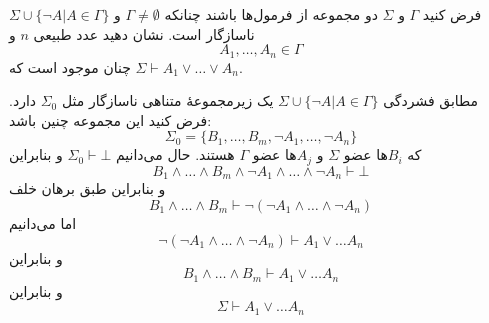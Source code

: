 فرض کنید $\Gamma$ و $\Sigma$ دو مجموعه از فرمول‌ها باشند چنانکه $\Gamma\neq\emptyset$ و
$\Sigma\cup\{\neg A|A\in\Gamma\}$
ناسازگار است. نشان دهید عدد طبیعی $n$ و
$$
A_1,\ldots,A_n\in\Gamma
$$
چنان موجود است که
$\Sigma\vdash A_1\vee\ldots\vee A_n$.
\begin{ans}
  مطابق فشردگی
  $\Sigma\cup\{\neg A|A\in\Gamma\}$
  یک زیرمجموعهٔ متناهی ناسازگار مثل
  $\Sigma_0$
  دارد. فرض کنید این مجموعه چنین باشد:
  $$
  \Sigma_0 = \{B_1,\ldots,B_m,\neg A_1,\ldots,\neg A_n\}
  $$
  که $B_i$ها عضو $\Sigma$ و $A_j$ها عضو $\Gamma$ هستند. حال می‌دانیم
  $\Sigma_0\vdash\bot$
  و بنابراین
  $$B_1\wedge\ldots\wedge B_m\wedge \neg A_1\wedge\ldots\wedge\neg A_n\vdash\bot$$
  و بنابراین طبق برهان خلف
  $$B_1\wedge\ldots\wedge B_m\vdash\neg(\neg A_1\wedge\ldots\wedge\neg A_n)$$
  اما می‌دانیم
  $$\neg(\neg A_1\wedge\ldots\wedge \neg A_n)\vdash A_1\vee\ldots A_n$$
  و بنابراین
  $$B_1\wedge\ldots\wedge B_m\vdash A_1\vee\ldots A_n$$
  و بنابراین
  $$\Sigma\vdash A_1\vee\ldots A_n$$
\end{ans}